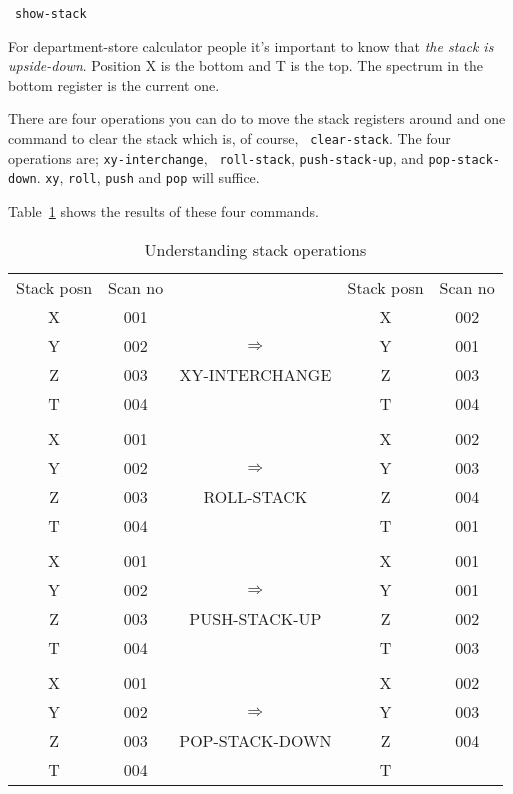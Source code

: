 \SP\ \verb|show-stack|

For department-store calculator people it's important to know that
{\em the stack is upside-down}. Position X is the bottom and T is the
top.  The spectrum in the bottom register is the current one.

There are four operations you can do to move the stack registers
around and one command to clear the stack which is, of course, {\tt
clear-stack}. The four operations are; {\tt xy-interchange}, {\tt
roll-stack}, {\tt push-stack-up}, and {\tt pop-stack-down}. {\tt xy},
{\tt roll}, {\tt push} and {\tt pop} will suffice.

Table~\ref{tab:specx_tab1} shows the results of these four commands.

\begin{table}[htb]
\caption{Understanding stack operations}
\begin{center}
\begin{tabular}{ccccc}
Stack posn & Scan no &      & Stack posn & Scan no \\ 
X & 001 &                                & X & 002 \\ 
Y & 002 & {\huge $\Longrightarrow$}      & Y & 001 \\
Z & 003 & {\footnotesize XY-INTERCHANGE} & Z & 003 \\
T & 004 &                                & T & 004 \\
  &     &                                &   &     \\
X & 001 &                                & X & 002 \\ 
Y & 002 & {\huge $\Longrightarrow$}      & Y & 003 \\
Z & 003 & {\footnotesize ROLL-STACK}     & Z & 004 \\
T & 004 &                                & T & 001 \\
  &     &                                &   &     \\
X & 001 &                                & X & 001 \\
Y & 002 & {\huge $\Longrightarrow$}      & Y & 001 \\
Z & 003 & {\footnotesize PUSH-STACK-UP}  & Z & 002 \\
T & 004 &                                & T & 003 \\
  &     &                                &   &     \\
X & 001 &                                & X & 002 \\
Y & 002 & {\huge $\Longrightarrow$}      & Y & 003 \\
Z & 003 & {\footnotesize POP-STACK-DOWN} & Z & 004 \\
T & 004 &                                & T &     \\
\end{tabular}
\label{tab:specx_tab1}
\end{center}
\end{table}

